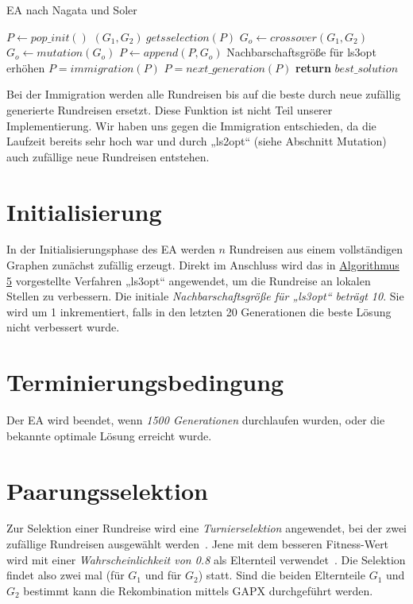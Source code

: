 \begin{algorithm}[H]
\caption{EA nach Nagata und Soler }\label{alg:ea}
\begin{algorithmic}[1]
    \State $P \gets pop\_init()$
      \State $(G_1, G_2) \ gets selection(P)$
      \State $G_o \gets crossover(G_1, G_2)$
        \State $G_o \gets mutation(G_o)$
      \EndIf
      \State $P \gets append(P, G_o)$
        \State Nachbarschaftsgröße für ls3opt erhöhen
        \State $P = immigration(P)$
      \EndIf
      \State $P = next\_generation(P)$
    \EndWhile
    \State \textbf{return} $best\_solution$
  \EndProcedure
\end{algorithmic}
\end{algorithm}
\begin{bem}
  Bei der Immigration werden alle Rundreisen bis auf die beste durch
  neue zufällig generierte Rundreisen ersetzt. Diese Funktion ist nicht
  Teil unserer Implementierung. Wir haben uns gegen die Immigration
  entschieden, da die Laufzeit bereits sehr hoch war und durch „ls2opt“
  (siehe Abschnitt Mutation) auch zufällige neue Rundreisen entstehen.
\end{bem}
\section{Initialisierung}
In der Initialisierungsphase des EA werden $n$ Rundreisen aus einem
vollständigen Graphen zunächst zufällig erzeugt. Direkt im Anschluss
wird das in \hyperref[alg:ls3opt_run]{Algorithmus 5} vorgestellte Verfahren 
„ls3opt“ angewendet, um die
Rundreise an lokalen Stellen zu verbessern. Die initiale
\textit{Nachbarschaftsgröße für „ls3opt“ beträgt 10}. Sie wird um 1
inkrementiert, falls in den letzten 20 Generationen die beste Lösung
nicht verbessert wurde.
\section{Terminierungsbedingung}
Der EA wird beendet, wenn \textit{1500 Generationen} durchlaufen wurden, oder
die bekannte optimale Lösung erreicht wurde. 
\section{Paarungsselektion}
Zur Selektion einer Rundreise wird eine \textit{Turnierselektion} angewendet, 
bei der zwei zufällige Rundreisen ausgewählt werden~\cite{weicker}. Jene mit dem
besseren Fitness-Wert wird mit einer \textit{Wahrscheinlichkeit von 0.8} als 
Elternteil verwendet~\cite{gapx}. Die Selektion findet also zwei mal 
(für $G_1$ und für $G_2$) statt. Sind die beiden Elternteile $G_1$ und
$G_2$ bestimmt kann die Rekombination mittels GAPX durchgeführt werden.
